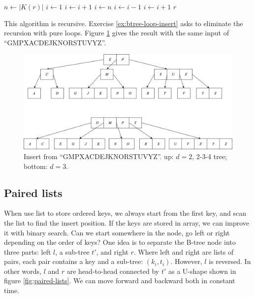 \documentclass[b5paper]{article}
\begin{document}
\begin{algorithmic}[1]
  \State $n \gets |K(r)|$
    \State $i \gets 1$
      \State $i \gets i + 1$
    \EndWhile
    \State {}
  \Else
    \State $i \gets n$
      \State $i \gets i - 1$
    \EndWhile
      \State {}
        \State $i \gets i + 1$
      \EndIf
    \EndIf
    \State {}
  \EndIf
  \State \Return $r$
\EndFunction
\end{algorithmic}

This algorithm is recursive. Exercise \ref{ex:btree-loop-insert} asks to eliminate the recursion with pure loops. Figure \ref{fig:btree-insert} gives the result with the same input of ``GMPXACDEJKNORSTUVYZ''.

\begin{figure}[htbp]
  \centering
  \includegraphics[scale=0.5]{img/btree-split-insert-example.png}
  \caption{Insert from ``GMPXACDEJKNORSTUVYZ''. up: $d = 2$, 2-3-4 tree; bottom: $d = 3$.}
  \label{fig:btree-insert}
\end{figure}

\subsection{Paired lists}

When use list to store ordered keys, we always start from the first key, and scan the list to find the insert position. If the keys are stored in array, we can improve it with binary search. Can we start somewhere in the node, go left or right depending on the order of keys? One idea is to separate the B-tree node into three parts: left $l$, a sub-tree $t'$, and right $r$. Where left and right are lists of pairs, each pair contains a key and a sub-tree: $(k_i, t_i)$. However, $l$ is reversed. In other words, $l$ and $r$ are head-to-head connected by $t'$ as a U-shape shown in figure \ref{fig:paired-lists}. We can move forward and backward both in constant time.
\end{document}
